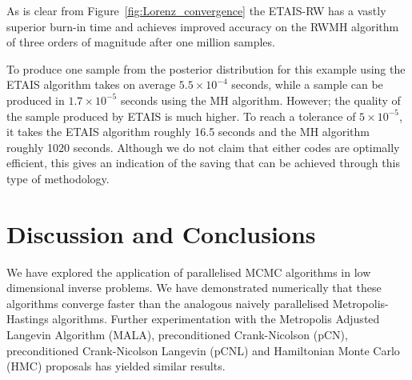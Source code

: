 \documentclass[final]{siamltex}
\begin{document}
As is clear from Figure~\ref{fig:Lorenz_convergence} the ETAIS-RW has a vastly superior burn-in time and achieves improved accuracy on the RWMH algorithm of three orders of magnitude after one million samples.

To produce one sample from the posterior distribution for this example
using the ETAIS algorithm takes on average $5.5\times 10^{-4}$ seconds,
while a sample can be produced in $1.7\times 10^{-5}$ seconds using
the MH algorithm. However; the quality of the sample produced by ETAIS
is much higher. To reach a tolerance of $5\times 10^{-5}$, it takes
the ETAIS algorithm roughly 16.5 seconds and the MH algorithm roughly
1020 seconds. Although we do not claim that either codes are optimally
efficient, this gives an indication of the saving that can be achieved
through this type of methodology.


\section{Discussion and Conclusions}\label{Sec:Conc} 

We have explored the application of parallelised MCMC algorithms in
low dimensional inverse problems. We have demonstrated numerically
that these algorithms converge faster than the analogous naively parallelised
Metropolis-Hastings algorithms. Further experimentation with the Metropolis
Adjusted Langevin Algorithm (MALA), preconditioned Crank-Nicolson (pCN),
preconditioned Crank-Nicolson Langevin (pCNL) and Hamiltonian
Monte Carlo (HMC) proposals has yielded similar results\cite{Paul}.

  
\end{document}
